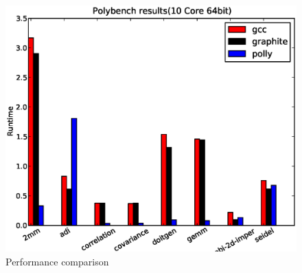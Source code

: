 \begin{figure}
  \label{fig:10core}
  \includegraphics[width=1\textwidth]{images/10core64bit.eps}
  \caption{Performance comparison}
\end{figure}
